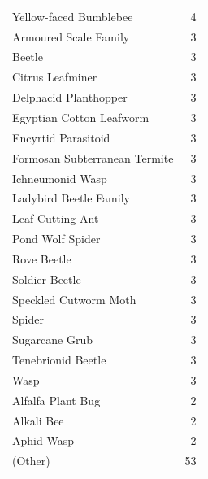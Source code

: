 \documentclass[
  12pt,
]{article}
\begin{document}
\begin{longtable}[]{@{}lr@{}}
Yellow-faced Bumblebee & 4 \\
Armoured Scale Family & 3 \\
Beetle & 3 \\
Citrus Leafminer & 3 \\
Delphacid Planthopper & 3 \\
Egyptian Cotton Leafworm & 3 \\
Encyrtid Parasitoid & 3 \\
Formosan Subterranean Termite & 3 \\
Ichneumonid Wasp & 3 \\
Ladybird Beetle Family & 3 \\
Leaf Cutting Ant & 3 \\
Pond Wolf Spider & 3 \\
Rove Beetle & 3 \\
Soldier Beetle & 3 \\
Speckled Cutworm Moth & 3 \\
Spider & 3 \\
Sugarcane Grub & 3 \\
Tenebrionid Beetle & 3 \\
Wasp & 3 \\
Alfalfa Plant Bug & 2 \\
Alkali Bee & 2 \\
Aphid Wasp & 2 \\
(Other) & 53 \\
\bottomrule
\end{longtable}
\end{document}
